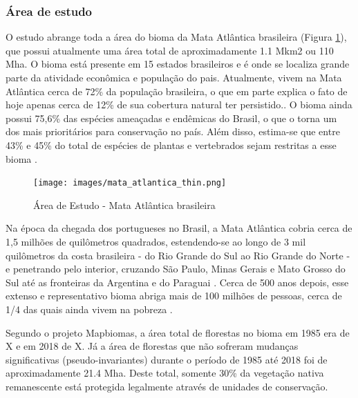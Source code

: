 \documentclass[12pt,a4paper]{article}
\begin{document}
\subsubsection{Área de estudo}
\hspace{13pt} O estudo abrange toda a área do bioma da Mata Atlântica brasileira (Figura \ref{fig:mata_atlantica}), que possui atualmente uma área total de aproximadamente 1.1 Mkm2 ou 110 Mha. O bioma está presente em 15 estados brasileiros e é onde se localiza grande parte da atividade econômica e população do pais. Atualmente, vivem na Mata Atlântica cerca de 72\% da população brasileira, o que em parte explica o fato de hoje apenas cerca de 12\% de sua cobertura natural ter persistido.. O bioma ainda possui 75,6\% das espécies ameaçadas e endêmicas do Brasil, o que o torna um dos mais prioritários para conservação no país. Além disso, estima-se que entre 43\% e 45\% do total de espécies de plantas e vertebrados sejam restritas a esse bioma \citep{scarano2014}.

\begin{figure}[h!]
    \centering
    \texttt{[image: images/mata\_atlantica\_thin.png]}
    \caption{Área de Estudo - Mata Atlântica brasileira}
    \label{fig:mata_atlantica}
\end{figure}

Na época da chegada dos portugueses no Brasil, a Mata Atlântica cobria cerca de 1,5 milhões de quilômetros quadrados, estendendo-se ao longo de 3 mil quilômetros da costa brasileira - do Rio Grande do Sul ao Rio Grande do Norte - e penetrando pelo interior, cruzando São Paulo, Minas Gerais e Mato Grosso do Sul até as fronteiras da Argentina e do Paraguai \citep{scarano2014}. Cerca de 500 anos depois, esse extenso e representativo bioma abriga mais de 100 milhões de pessoas, cerca de 1/4 das quais ainda vivem na pobreza \citep{scarano2014}.

Segundo o projeto Mapbiomas, a área total de florestas no bioma em 1985 era de X e em 2018 de X. Já a área de florestas que não sofreram mudanças significativas (pseudo-invariantes) durante o período de 1985 até 2018 foi de aproximadamente 21.4 Mha. Deste total, somente  30\% da vegetação nativa remanescente está protegida legalmente através de unidades de conservação.

\end{document}
